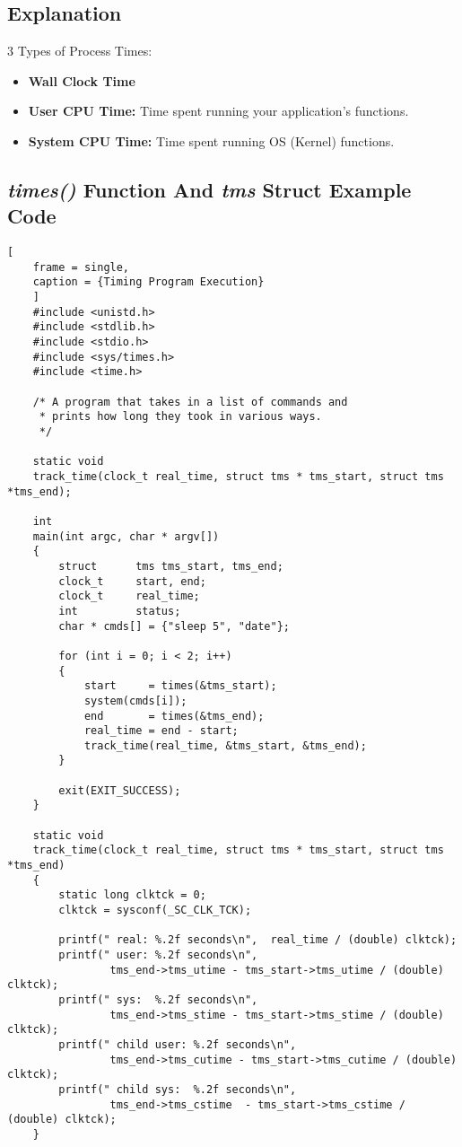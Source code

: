 \documentclass{article}
\newcommand\be[1]{\textbf{\emph{#1}}}
\begin{document}
\subsection{Explanation}
3 Types of Process Times:
\begin{itemize}
    \item \textbf{Wall Clock Time}
    \item \textbf{User CPU Time:} Time spent running your application's functions.
    \item \textbf{System CPU Time:} Time spent running OS (Kernel) functions.
\end{itemize}
\subsection{\be{times()} Function And \be{tms} Struct Example Code}
\begin{lstlisting}[
    frame = single,
    caption = {Timing Program Execution}
    ]
    #include <unistd.h>
    #include <stdlib.h>
    #include <stdio.h>
    #include <sys/times.h>
    #include <time.h>

    /* A program that takes in a list of commands and 
     * prints how long they took in various ways.
     */

    static void 
    track_time(clock_t real_time, struct tms * tms_start, struct tms *tms_end);

    int 
    main(int argc, char * argv[])
    {
        struct      tms tms_start, tms_end;
        clock_t     start, end;
        clock_t     real_time;
        int         status;
        char * cmds[] = {"sleep 5", "date"};

        for (int i = 0; i < 2; i++) 
        {
            start     = times(&tms_start);
            system(cmds[i]);
            end       = times(&tms_end);
            real_time = end - start;
            track_time(real_time, &tms_start, &tms_end);
        }

        exit(EXIT_SUCCESS);
    }

    static void 
    track_time(clock_t real_time, struct tms * tms_start, struct tms *tms_end)
    {
        static long clktck = 0;
        clktck = sysconf(_SC_CLK_TCK);

        printf(" real: %.2f seconds\n",  real_time / (double) clktck);
        printf(" user: %.2f seconds\n",
                tms_end->tms_utime - tms_start->tms_utime / (double) clktck);
        printf(" sys:  %.2f seconds\n",
                tms_end->tms_stime - tms_start->tms_stime / (double) clktck);
        printf(" child user: %.2f seconds\n",
                tms_end->tms_cutime - tms_start->tms_cutime / (double) clktck);
        printf(" child sys:  %.2f seconds\n",
                tms_end->tms_cstime  - tms_start->tms_cstime / (double) clktck);
    }
\end{lstlisting}
\end{document}
